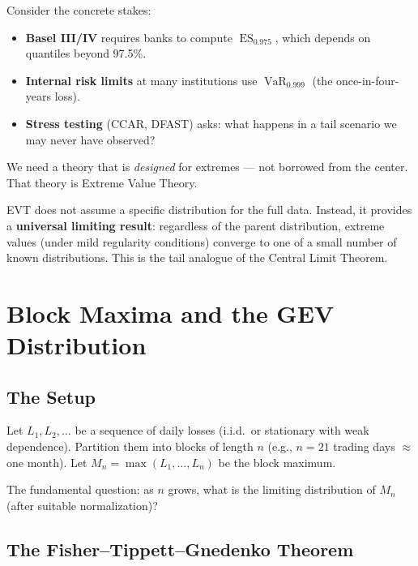\documentclass[11pt, a4paper]{article}
\theoremstyle{definition}
\theoremstyle{plain}
\theoremstyle{remark}
\newcommand{\VaR}{\operatorname{VaR}}
\newcommand{\ES}{\operatorname{ES}}
\begin{document}
Consider the concrete stakes:
\begin{itemize}
    \item \textbf{Basel III/IV} requires banks to compute $\ES_{0.975}$, which depends on quantiles beyond 97.5\%.
    \item \textbf{Internal risk limits} at many institutions use $\VaR_{0.999}$
          (the once-in-four-years loss).
    \item \textbf{Stress testing} (CCAR, DFAST) asks: what happens in a tail scenario
          we may never have observed?
\end{itemize}

We need a theory that is \emph{designed} for extremes --- not borrowed from the center.
That theory is Extreme Value Theory.

\begin{keyresult}
EVT does not assume a specific distribution for the full data.
Instead, it provides a \textbf{universal limiting result}: regardless of the parent distribution,
extreme values (under mild regularity conditions) converge to one of a small number of known distributions.
This is the tail analogue of the Central Limit Theorem.
\end{keyresult}

\section{Block Maxima and the GEV Distribution}
\label{sec:gev}

\subsection{The Setup}

Let $L_1, L_2, \ldots$ be a sequence of daily losses (i.i.d.\ or stationary with weak dependence).
Partition them into blocks of length $n$ (e.g., $n = 21$ trading days $\approx$ one month).
Let $M_n = \max(L_1, \ldots, L_n)$ be the block maximum.

The fundamental question: as $n$ grows, what is the limiting distribution of $M_n$
(after suitable normalization)?

\subsection{The Fisher--Tippett--Gnedenko Theorem}
\end{document}
